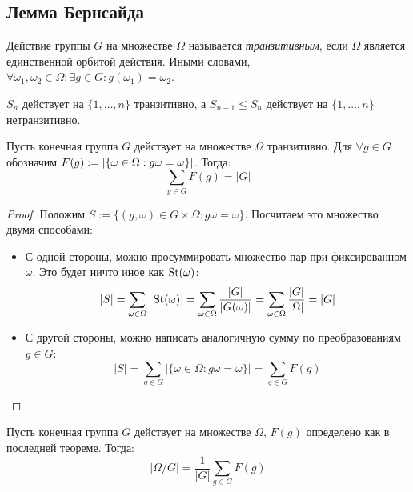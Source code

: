 \subsection{Лемма Бернсайда}

\begin{definition}
	Действие группы $G$ на множестве $\Omega$ называется \textit{транзитивным}, если $\Omega$ является единственной орбитой действия. Иными словами, $\forall \omega_1, \omega_2 \in \Omega: \exists g \in G: g(\omega_1) = \omega_2$.
\end{definition}

\begin{example}
	$S_n$ действует на $\{1, \dotsc, n\}$ транзитивно, а $S_{n-1} \le S_n$ действует на $\{1, \dotsc, n\}$ нетранзитивно.
\end{example}

\begin{theorem}
	Пусть конечная группа $G$ действует на множестве $\Omega$ транзитивно. Для $\forall g \in G$ обозначим $F(g) := |\{\omega \hm\in \Omega: g\omega = \omega\}|$. Тогда:
	\[\sum\limits_{g \in G}F(g) = |G|\]
\end{theorem}

\begin{proof}
	Положим $S := \{(g, \omega) \in G \times \Omega \colon g\omega = \omega\}$. Посчитаем это множество двумя способами:
	\begin{itemize}
		\item С одной стороны, можно просуммировать множество пар при фиксированном $\omega$. Это будет ничто иное как $\operatorname{St}(\omega)$:
		\[
			|S| = \sum_{\omega \in \Omega} |\operatorname{St}(\omega)| = \sum_{\omega \in \Omega} \frac{|G|}{|G(\omega)|} = \sum_{\omega \in \Omega} \frac{|G|}{|\Omega|} = |G|
		\]
		
		\item С другой стороны, можно написать аналогичную сумму по преобразованиям $g \in G$:
		\[
			|S| = \sum_{g \in G} |\{\omega \in \Omega \colon g\omega = \omega\}| = \sum_{g \in G} F(g)
		\]
	\end{itemize}
\end{proof}

\begin{corollary}
	Пусть конечная группа $G$ действует на множестве $\Omega$, $F(g)$ определено как в последней теореме. Тогда:
	\[
		|\Omega / G| = \frac{1}{|G|} \sum_{g \in G} F(g)
	\]
\end{corollary}

